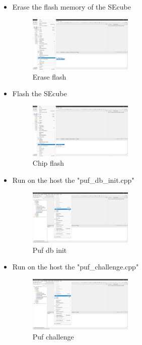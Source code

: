 \begin{itemize}
\item {Erase the flash memory of the SEcube}

\begin{figure}[H]
\centering
  \includegraphics[width=5cm]{../../images/erase_flash.png}
  \caption{Erase flash}
  \label{fig:Erase flash}
\end{figure}

\item {Flash the SEcube}
\begin{figure}[H]
\centering
  \includegraphics[width=5cm]{../../images/chip_flash.png}
  \caption{Chip flash}
  \label{fig:Chip flash}
\end{figure}


\item {Run on the host the "puf\_db\_init.cpp"}
\begin{figure}[H]
\centering
  \includegraphics[width=5cm]{../../images/puf_db_init.png}
  \caption{Puf db init}
  \label{fig:Puf db init}
\end{figure}

\item {Run on the host the "puf\_challenge.cpp"}
\begin{figure}[H]
\centering
  \includegraphics[width=5cm]{../../images/puf_challenge.png}
  \caption{Puf challenge}
  \label{fig:Puf challenge}
\end{figure}

\end{itemize}




